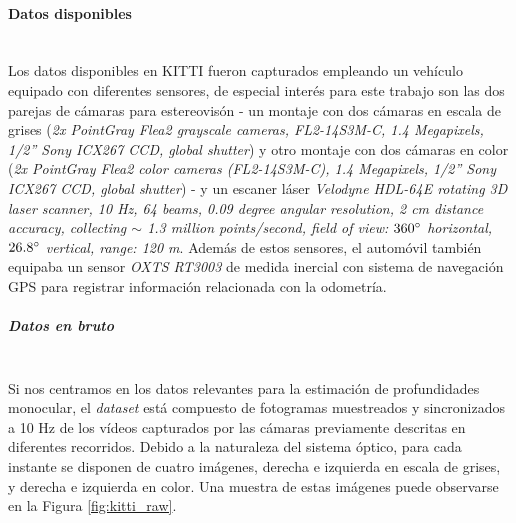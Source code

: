 \documentclass[a4paper, 11pt]{article}
\begin{document}
\paragraph{Datos disponibles}\mbox{}\\
Los datos disponibles en KITTI fueron capturados empleando un vehículo equipado con diferentes sensores, de especial interés para este trabajo son las dos parejas de cámaras para estereovisón - un montaje con dos cámaras en escala de grises (\textit{2x PointGray Flea2 grayscale cameras, FL2-14S3M-C, 1.4 Megapixels, 1/2” Sony ICX267 CCD, global shutter}) y otro montaje con dos cámaras en color (\textit{2x PointGray Flea2 color cameras (FL2-14S3M-C), 1.4 Megapixels, 1/2” Sony ICX267 CCD, global shutter}) - y un escaner láser \textit{Velodyne HDL-64E rotating 3D laser scanner, 10 Hz, 64 beams, 0.09 degree angular resolution, 2 cm distance accuracy, collecting $\sim$ 1.3 million points/second, field of view: $360\degree$ horizontal, $26.8\degree$ vertical, range: 120 m}. 
Además de estos sensores, el automóvil también equipaba un sensor \textit{OXTS RT3003} de medida inercial con sistema de navegación GPS para registrar información relacionada con la odometría.

\subparagraph{Datos en bruto}\mbox{}\\
Si nos centramos en los datos relevantes para la estimación de profundidades monocular, el \textit{dataset} está compuesto de fotogramas muestreados y sincronizados a 10 Hz de los vídeos capturados por las cámaras previamente descritas en diferentes recorridos. Debido a la naturaleza del sistema óptico, para cada instante se disponen de cuatro imágenes, derecha e izquierda en escala de grises, y derecha e izquierda en color. Una muestra de estas imágenes puede observarse en la Figura \ref{fig:kitti_raw}.
\end{document}
